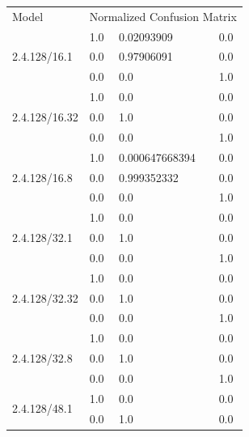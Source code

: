 \documentclass[12pt]{article}
\begin{document}
\begin{longtable}{llll}
Model                    & \multicolumn{3}{l}{Normalized Confusion Matrix} \\ 
\multirow{3}{*}{2.4.128/16.1}   &  1.0 & 0.02093909 & 0.0 \\
                                                                            &  0.0 & 0.97906091 & 0.0 \\
                                                                            &  0.0 & 0.0 & 1.0 \\ \hline
\multirow{3}{*}{2.4.128/16.32}   &  1.0 & 0.0 & 0.0 \\
                                                                            &  0.0 & 1.0 & 0.0 \\
                                                                            &  0.0 & 0.0 & 1.0 \\ \hline
\multirow{3}{*}{2.4.128/16.8}   &  1.0 & 0.000647668394 & 0.0 \\
                                                                            &  0.0 & 0.999352332 & 0.0 \\
                                                                            &  0.0 & 0.0 & 1.0 \\ \hline
\multirow{3}{*}{2.4.128/32.1}   &  1.0 & 0.0 & 0.0 \\
                                                                            &  0.0 & 1.0 & 0.0 \\
                                                                            &  0.0 & 0.0 & 1.0 \\ \hline
\multirow{3}{*}{2.4.128/32.32}   &  1.0 & 0.0 & 0.0 \\
                                                                            &  0.0 & 1.0 & 0.0 \\
                                                                            &  0.0 & 0.0 & 1.0 \\ \hline
\multirow{3}{*}{2.4.128/32.8}   &  1.0 & 0.0 & 0.0 \\
                                                                            &  0.0 & 1.0 & 0.0 \\
                                                                            &  0.0 & 0.0 & 1.0 \\ \hline
\multirow{3}{*}{2.4.128/48.1}   &  1.0 & 0.0 & 0.0 \\
                                                                            &  0.0 & 1.0 & 0.0 \\

\end{longtable}
\end{document}
